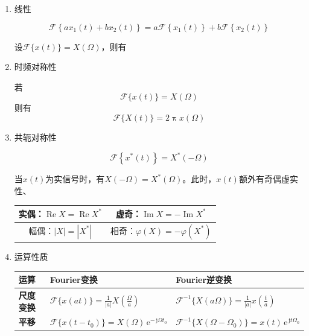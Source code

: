 \documentclass[UTF8,fontset=fandol,zihao=5]{ctexart}
\newcommand{\jj}{\,\mathrm{j}}
\newcommand{\ee}{\,\mathrm{e}}
\newcommand{\FF}{\mathcal{F}}
\newcommand{\RRe}{\operatorname{Re}}
\newcommand{\IIm}{\operatorname{Im}}
\begin{document}
\begin{enumerate}
  \item 线性
  
  \[
  \FF \left\{ ax_1(t) + bx_2(t) \right\} = a \FF \left\{ x_1(t) \right\} + b \FF \left\{ x_2(t) \right\} 
  \]     

设$\displaystyle \FF \{ x(t) \} = X(\varOmega)$，则有

  \item 时频对称性
  
  若
  \[
  \FF \{ x(t) \} = X(\varOmega)
  \]
  则有
  \[
  \FF \{ X(t) \} = 2 \uppi x(\varOmega)
  \]

  \item 共轭对称性
  
  \[
  \FF \left\{ x^\ast(t) \right\} = X^\ast(-\varOmega)
  \]

  当$x(t)$为实信号时，有$\displaystyle X(-\varOmega) = X^\ast(\varOmega)$。此时，$x(t)$额外有奇偶虚实性、

    \begin{center}
    \renewcommand{\arraystretch}{1.5}
    \begin{tabular}{|c|c|}
    \hline
    实偶：$\RRe X=\RRe X^\ast$
    &
    虚奇：$\IIm X=-\IIm X^\ast$
    \\
    \hline
    幅偶：$|X|=|X^\ast|$
    &
    相奇：$\varphi(X)=-\varphi(X^\ast)$
    \\
    \hline
    \end{tabular}
    \end{center}

  \item 运算性质
    \begin{center}
    \begin{tabularx}{0.98\textwidth}{>{\bfseries}p{1.5cm}X X}
    \toprule
    运算 & Fourier变换 & Fourier逆变换 \\
    \midrule

    尺度变换
    &
    $\displaystyle
    \FF \{ x(at) \}
    =
    \frac{1}{|a|}
    X\left(\frac{\varOmega}{a}\right)
    $
    &
    $\displaystyle
    \FF^{-1} \{ X(a\varOmega) \}
    =
    \frac{1}{|a|}
    x\left(\frac{t}{a}\right)
    $
    \\

    平移
    &
    $\displaystyle
    \FF \{ x(t-t_0) \}
    =
    X(\varOmega)\ee^{-\jj \varOmega t_0}
    $
    &
    $\displaystyle
    \FF^{-1} \{ X(\varOmega-\varOmega_0) \}
    =
    x(t)\ee^{\jj t\varOmega_0}
    $
    \\


\end{tabularx}
\end{center}
\end{enumerate}
\end{document}
